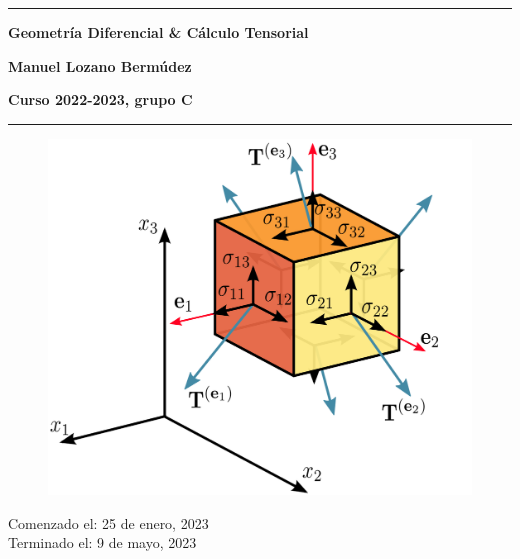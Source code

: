 \begin{titlepage}
   \raggedright
       \vspace*{1cm}
       \noindent\rule{\textwidth}{0.5pt}
        \Huge
       \textbf{Geometría Diferencial \& Cálculo Tensorial}
       
        \Large
       \vspace{0.5cm}
       \textbf{Manuel Lozano Bermúdez}

       \large
       \vspace{0.5 cm}
       \textbf{Curso 2022-2023, grupo C}
       \noindent\rule{\textwidth}{0.5pt}
        \vspace{1.5 cm}
       \begin{figure}[h]
           \centering
           \includegraphics[scale=.3]{FOTOS/portada_def.png}
           \label{fig:portada}
       \end{figure}

        \vspace*{\fill}
        
         \Large
         Comenzado el: 25 de enero, 2023\\
         Terminado el: 9 de mayo, 2023


\end{titlepage}
